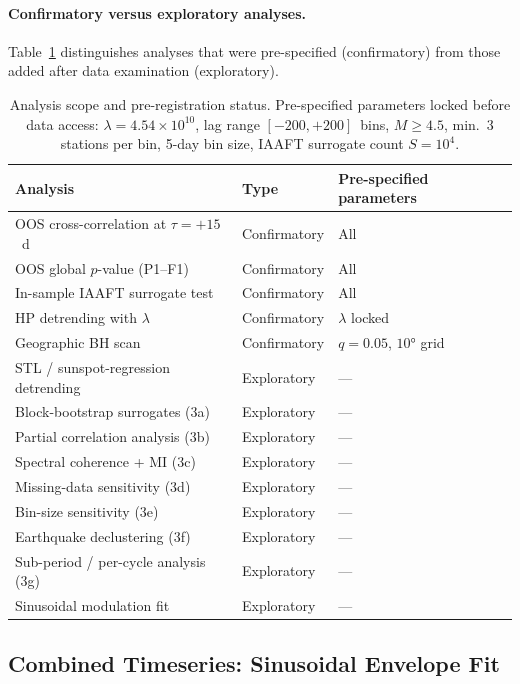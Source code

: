 \documentclass[12pt,a4paper]{article}
\begin{document}
\paragraph{Confirmatory versus exploratory analyses.}
Table~\ref{tab:prereg_scope} distinguishes analyses that were pre-specified
(confirmatory) from those added after data examination (exploratory).

\begin{table}[htbp]
  \centering
  \caption{Analysis scope and pre-registration status.
  Pre-specified parameters locked before data access: $\lambda = 4.54 \times 10^{10}$,
  lag range $[-200, +200]$~bins, $M \geq 4.5$, min.\ 3 stations per bin,
  5-day bin size, IAAFT surrogate count $S = 10^4$.}
  \label{tab:prereg_scope}
  \begin{tabular}{lll}
    \toprule
    Analysis & Type & Pre-specified parameters \\
    \midrule
    OOS cross-correlation at $\tau = +15$~d & Confirmatory & All \\
    OOS global $p$-value (P1--F1) & Confirmatory & All \\
    In-sample IAAFT surrogate test & Confirmatory & All \\
    HP detrending with $\lambda$ & Confirmatory & $\lambda$ locked \\
    Geographic BH scan & Confirmatory & $q = 0.05$, $10°$ grid \\
    \addlinespace
    STL / sunspot-regression detrending & Exploratory & — \\
    Block-bootstrap surrogates (3a) & Exploratory & — \\
    Partial correlation analysis (3b) & Exploratory & — \\
    Spectral coherence + MI (3c) & Exploratory & — \\
    Missing-data sensitivity (3d) & Exploratory & — \\
    Bin-size sensitivity (3e) & Exploratory & — \\
    Earthquake declustering (3f) & Exploratory & — \\
    Sub-period / per-cycle analysis (3g) & Exploratory & — \\
    Sinusoidal modulation fit & Exploratory & — \\
    \bottomrule
  \end{tabular}
\end{table}

\subsection{Combined Timeseries: Sinusoidal Envelope Fit}
\label{sec:sinusoid}
\end{document}
